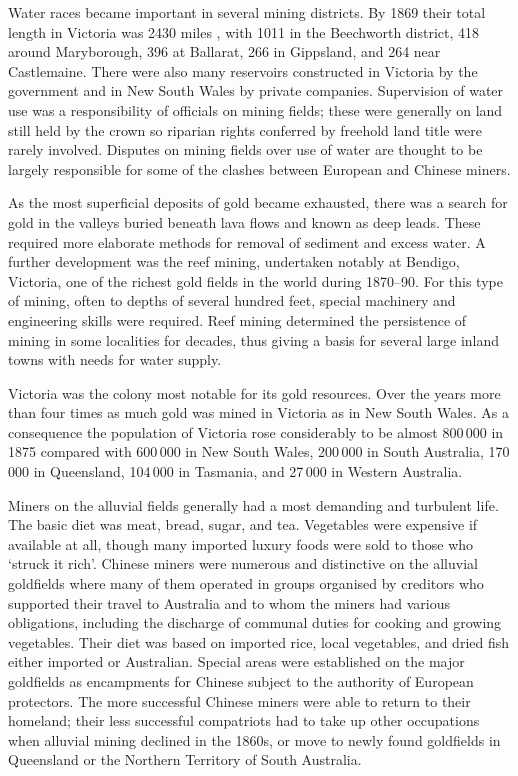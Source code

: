 Water races became important in several mining districts.  By 1869
their total length in Victoria was 2430 miles , with 1011 in the
Beechworth  district, 418 around Maryborough,
 396 at Ballarat,  266 in
Gippsland,  and 264 near Castlemaine.
 There were also many reservoirs
constructed in Victoria by the government and in New South Wales by
private companies.  Supervision of water use was a responsibility of
officials on mining fields; these were generally on land still held by
the crown so riparian rights  conferred by
freehold land title were rarely involved.  Disputes on mining fields
over use of water are thought to be largely responsible for some of
the clashes between European and Chinese 
miners.

As the most superficial deposits of gold became exhausted, there was a
search for gold in the valleys buried beneath lava flows and known as
deep leads.  These required more elaborate methods for removal of
sediment and excess water.  A further development was the reef mining,
undertaken notably at Bendigo,  Victoria, one of the
richest gold fields in the world during 1870--90.  For this type of
mining, often to depths of several hundred feet, special machinery and
engineering skills were required.  Reef mining determined the
persistence of mining in some localities for decades, thus giving a
basis for several large inland towns with needs for water supply.

Victoria was the colony most notable for its gold resources.  Over the
years more than four times as much gold was mined in Victoria as in
New South Wales.  As a consequence the population of Victoria rose
considerably to be almost 800\,000 in 1875 compared with 600\,000 in
New South Wales, 200\,000 in South Australia, 170\,000 in Queensland,
104\,000 in Tasmania, and 27\,000 in Western Australia.\fn{Comm.\
Bur.\ Census and Statistics, \textit{Demography Bull}.\ no.\,67,
1949.}

Miners on the alluvial fields generally had a most demanding and
turbulent life.  The basic diet was meat, bread, sugar, and tea.
Vegetables were expensive if available at all, though many imported
luxury foods were sold to those who `struck it rich'.  Chinese miners
were numerous and distinctive on the alluvial goldfields where many of
them operated in groups organised by creditors who supported their
travel to Australia and to whom the miners had various obligations,
including the discharge of communal duties for cooking and growing
vegetables.  Their diet was based on imported rice, local vegetables,
and dried fish either imported or Australian.  Special areas were
established on the major goldfields as encampments for Chinese subject
to the authority of European protectors.  The more successful Chinese
miners were able to return to their homeland; their less successful
compatriots had to take up other occupations when alluvial mining
declined in the 1860s, or move to newly found goldfields in Queensland
or the Northern Territory of South
Australia.


